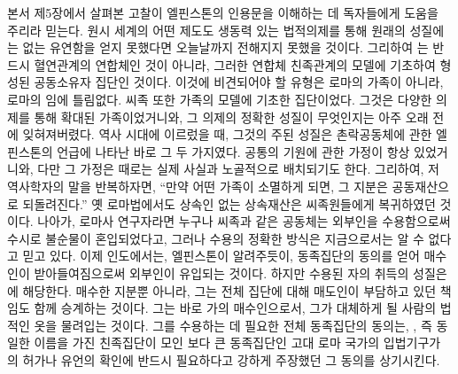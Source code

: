 본서 제5장에서 살펴본 고찰이 엘핀스톤의 인용문을 이해하는 데
독자들에게 도움을 주리라 믿는다.
원시 세계의 어떤 제도도
생동력 있는 법적의제를 통해
원래의 성질에는 없는 유연함을
얻지 못했다면
오늘날까지 전해지지 못했을 것이다.
그리하여 는 반드시 혈연관계의 연합체인 것이 아니라,
그러한 연합체 친족관계의 모델에 기초하여 형성된
공동소유자 집단인 것이다.
이것에 비견되어야 할 유형은 로마의 가족이 아니라,
로마의 임에 틀림없다.
씨족 또한 가족의 모델에 기초한 집단이었다.
그것은 다양한 의제를 통해 확대된 가족이었거니와,
그 의제의 정확한 성질이 무엇인지는 아주 오래 전에 잊혀져버렸다.
역사 시대에 이르렀을 때, 그것의 주된 성질은
촌락공동체에 관한 엘핀스톤의 언급에 나타난 바로 그 두 가지였다.
공통의 기원에 관한 가정이 항상 있었거니와,
다만 그 가정은 때로는 실제 사실과 노골적으로 배치되기도 한다.
그리하여, 저 역사학자의 말을 반복하자면,
``만약 어떤 가족이 소멸하게 되면, 그 지분은 공동재산으로 되돌려진다.''
옛 로마법에서도 상속인 없는 상속재산은
씨족원들에게 복귀하였던 것이다.
나아가, 로마사 연구자라면 누구나
씨족과 같은 공동체는 외부인을 수용함으로써 수시로 불순물이 혼입되었다고,
그러나 수용의 정확한 방식은 지금으로서는 알 수 없다고 믿고 있다.
이제 인도에서는, 엘핀스톤이 알려주듯이,
동족집단의 동의를 얻어 매수인이 받아들여짐으로써
외부인이 유입되는 것이다.
하지만 수용된 자의 취득의 성질은
에 해당한다.
매수한 지분뿐 아니라,
그는
전체 집단에 대해 매도인이 부담하고 있던 책임도
함께
승계하는 것이다.
%
그는 바로 가의 매수인으로서,
그가 대체하게 될 사람의 법적인 옷\hanja{[衣服]}을 물려입는 것이다.
그를 수용하는 데 필요한 전체 동족집단의 동의는,
, 즉
동일한 이름을 가진 친족집단이 모인 보다 큰 동족집단인 고대 로마 국가의
입법기구가
의 허가나 유언의 확인에 반드시 필요하다고 강하게 주장했던
그 동의를 상기시킨다.

